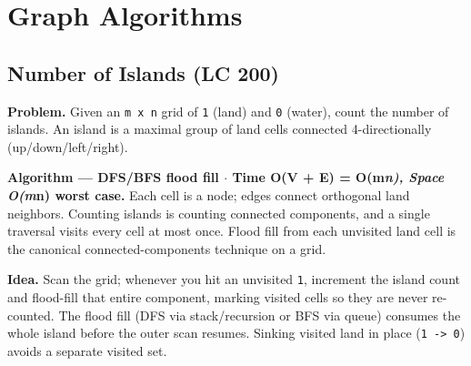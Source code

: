 \documentclass[11pt]{article}
\begin{document}
\section{Graph Algorithms}\label{graph-algorithms}

\subsection{Number of Islands (LC 200)}\label{number-of-islands-lc-200}

\textbf{Problem.} Given an \texttt{m\ x\ n} grid of \texttt{\textquotesingle{}1\textquotesingle{}} (land) and \texttt{\textquotesingle{}0\textquotesingle{}} (water), count the number of islands. An island is a maximal group of land cells connected 4-directionally (up/down/left/right).

\textbf{Algorithm --- DFS/BFS flood fill \(\cdot\) Time O(V + E) = O(m\emph{n), Space O(m}n) worst case.} Each cell is a node; edges connect orthogonal land neighbors. Counting islands is counting connected components, and a single traversal visits every cell at most once. Flood fill from each unvisited land cell is the canonical connected-components technique on a grid.

\textbf{Idea.} Scan the grid; whenever you hit an unvisited \texttt{\textquotesingle{}1\textquotesingle{}}, increment the island count and flood-fill that entire component, marking visited cells so they are never re-counted. The flood fill (DFS via stack/recursion or BFS via queue) consumes the whole island before the outer scan resumes. Sinking visited land in place (\texttt{\textquotesingle{}1\textquotesingle{}\ -\textgreater{}\ \textquotesingle{}0\textquotesingle{}}) avoids a separate visited set.

\end{document}
